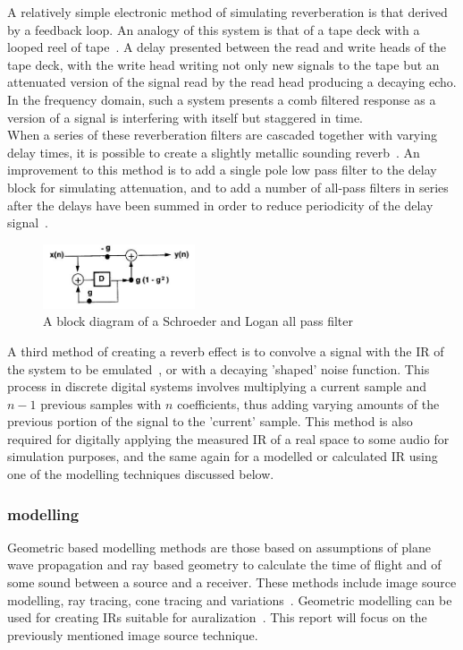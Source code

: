 \documentclass[paper=a4, fontsize=10pt, font=arial]{scrartcl} %
\numberwithin{equation}{section} %
\numberwithin{figure}{section} %
\numberwithin{table}{section} %
\begin{document}
A relatively simple electronic method of simulating reverberation is that derived by a feedback loop. An analogy of this system is that of a tape deck with a looped reel of tape~\cite{Begault1995}. A delay presented between the read and write heads of the tape deck, with the write head writing not only new signals to the tape but an attenuated version of the signal read by the read head producing a decaying echo. In the frequency domain, such a system presents a comb filtered response as a version of a signal is interfering with itself but staggered in time.\\ 
When a series of these reverberation filters are cascaded together with varying delay times, it is possible to create a slightly metallic sounding reverb~\cite{Begault1995}. An improvement to this method is to add a single pole low pass filter to the delay block for simulating attenuation, and to add  a number of all-pass filters in series after the delays have been summed in order to reduce periodicity of the delay signal~\cite{Logan1961}.\\

\begin{figure}[H]
\centering
\includegraphics[width=0.4\textwidth]{apfblockdiagram.jpg}
\caption{A block diagram of a Schroeder and Logan all pass filter\cite{Begault1995}}
\end{figure}

A third method of creating a reverb effect is to convolve a signal with the IR of the system to be emulated~\cite{Lee2010}, or with a decaying 'shaped' noise function. This process in discrete digital systems involves multiplying a current sample and $n-1$ previous samples with $n$ coefficients, thus adding varying amounts of the previous portion of the signal to the 'current' sample. This method is also required for digitally applying the measured IR of a real space to some audio for simulation purposes, and the same again for a modelled or calculated IR using one of the modelling techniques discussed below. 

\subsubsection{modelling}
Geometric based modelling methods are those based on assumptions of plane wave propagation and ray based geometry to calculate the time of flight and  of some sound between a source and a receiver. These methods include image source modelling, ray tracing, cone tracing and variations~\cite{Elorza2005}. Geometric modelling can be used for creating IRs suitable for auralization~\cite{Oxnard2012}. This report will focus on the previously mentioned image source technique.\\
\end{document}
